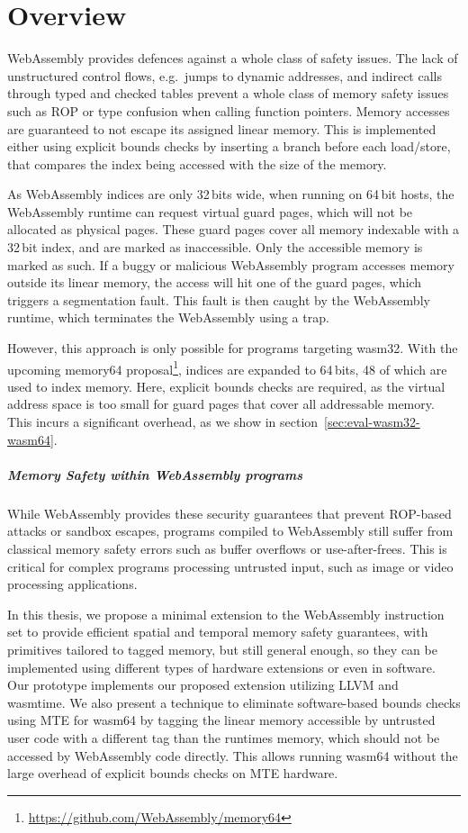 \chapter{Overview}
\label{ch:overview}

WebAssembly provides defences against a whole class of safety issues.
The lack of unstructured control flows, e.g.\ jumps to dynamic addresses, and indirect calls through typed and checked tables prevent a whole class of memory safety issues such as \ac{ROP} or type confusion when calling function pointers.
Memory accesses are guaranteed to not escape its assigned linear memory.
This is implemented either using explicit bounds checks by inserting a branch before each load/store, that compares the index being accessed with the size of the memory.

As WebAssembly indices are only 32\,bits wide, when running on 64\,bit hosts, the WebAssembly runtime can request virtual guard pages, which will not be allocated as physical pages.
These guard pages cover all memory indexable with a 32\,bit index, and are marked as inaccessible.
Only the accessible memory is marked as such.
If a buggy or malicious WebAssembly program accesses memory outside its linear memory, the access will hit one of the guard pages, which triggers a segmentation fault.
This fault is then caught by the WebAssembly runtime, which terminates the WebAssembly using a trap.

However, this approach is only possible for programs targeting wasm32.
With the upcoming memory64 proposal\footnote{\url{https://github.com/WebAssembly/memory64}}, indices are expanded to 64\,bits, 48 of which are used to index memory.
Here, explicit bounds checks are required, as the virtual address space is too small for guard pages that cover all addressable memory.
This incurs a significant overhead, as we show in section~\ref{sec:eval-wasm32-wasm64}.

\paragraph{Memory Safety within WebAssembly programs}
While WebAssembly provides these security guarantees that prevent \ac{ROP}-based attacks or sandbox escapes, programs compiled to WebAssembly still suffer from classical memory safety errors such as buffer overflows or use-after-frees.
This is critical for complex programs processing untrusted input, such as image or video processing applications.

In this thesis, we propose a minimal extension to the WebAssembly instruction set to provide efficient spatial and temporal memory safety guarantees, with primitives tailored to tagged memory, but still general enough, so they can be implemented using different types of hardware extensions or even in software.
Our prototype implements our proposed extension utilizing LLVM and wasmtime.
We also present a technique to eliminate software-based bounds checks using MTE for wasm64 by tagging the linear memory accessible by untrusted user code with a different tag than the runtimes memory, which should not be accessed by WebAssembly code directly.
This allows running wasm64 without the large overhead of explicit bounds checks on MTE hardware.
